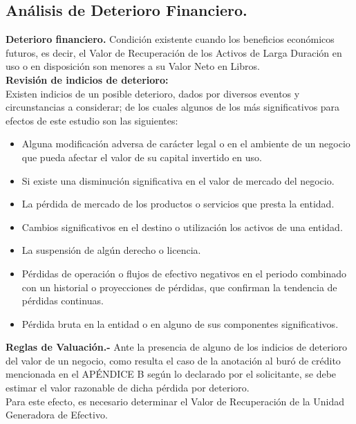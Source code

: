 
\subsection{Análisis de Deterioro Financiero.}

\textcolor{principal}{\textbf{Deterioro financiero.}} Condición existente cuando los beneficios económicos futuros, es decir, el Valor de Recuperación de los Activos de Larga Duración en uso o en disposición son menores a su Valor Neto en Libros.\\

\textcolor{principal}{\textbf{Revisión de indicios de deterioro:}}\\

Existen indicios de un posible deterioro, dados por diversos eventos y circunstancias a considerar; de los cuales algunos de los más significativos para efectos de este estudio son las siguientes:\\

\begin{itemize}
\item Alguna modificación adversa de carácter legal o en el ambiente de un negocio que pueda afectar el valor de su capital invertido en uso.
\item Si existe una disminución significativa en el valor de mercado del negocio.
\item La pérdida de mercado de los productos o servicios que presta la entidad.
\item Cambios significativos en el destino o utilización los activos de una entidad.
\item La suspensión de algún derecho o licencia.
\item Pérdidas de operación o flujos de efectivo negativos en el periodo combinado con un historial o proyecciones de pérdidas, que confirman la tendencia de pérdidas continuas.
\item Pérdida bruta en la entidad o en alguno de sus componentes significativos.

\end{itemize}

\textcolor{principal}{\textbf{Reglas de Valuación.-}} Ante la presencia de alguno de los indicios de deterioro del valor de un negocio, como resulta el caso de la anotación al buró de crédito mencionada en el APÉNDICE B según lo declarado por el solicitante, se debe estimar el valor razonable de dicha pérdida por deterioro. \\

Para este efecto, es necesario determinar el Valor de Recuperación de la Unidad Generadora de Efectivo.\\

